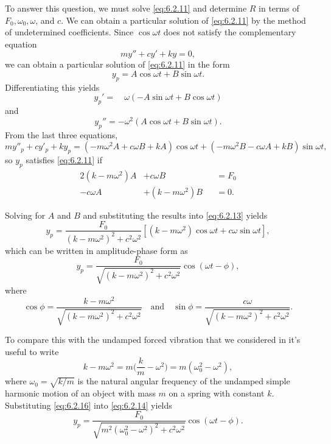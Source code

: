  To
answer this question, we must solve \eqref{eq:6.2.11} and determine $R$ in
terms of $F_0,\omega_0,\omega$, and $c$. We can obtain a particular
solution of \eqref{eq:6.2.11} by the method of undetermined coefficients.
Since $\cos\omega t$ does not satisfy the complementary equation
\[
my''+cy'+ky=0,
\]
we can obtain a particular solution of \eqref{eq:6.2.11} in the form
\begin{equation}\label{eq:6.2.13}
y_p=A\cos\omega t+B\sin\omega t.
\end{equation}
Differentiating this yields
\[
y_p'=\quad\omega (-A\sin\omega t+B\cos\omega t)
\]
and
\[
y_p''=-\omega^2(A\cos\omega t+B\sin\omega t).
\]
 From the last three equations,
\[
my''_p+cy'_p+ky_p=(-m\omega^2A+c\omega B+kA)\cos\omega t+
(-m\omega^2 B-c\omega A+kB)\sin\omega t,
\]
so $y_p$ satisfies  \eqref{eq:6.2.11}  if
\begin{alignat*}{2}
(k-m\omega^2) A&+ c\omega B &&=F_0\\
-c\omega A&+(k-m\omega^2)B &&=0.
\end{alignat*}

Solving  for $A$ and $B$
and substituting the results into  \eqref{eq:6.2.13} yields
\[
y_p=\frac{F_0}{(k-m\omega^2)^2+c^2\omega^2}
\left[(k-m\omega^2)\cos\omega t+c\omega\sin\omega t\right],
\]
which can be written in amplitude-phase form  as
\begin{equation}\label{eq:6.2.14} %
y_p=\frac{F_0}{\sqrt{(k-m\omega^2)^2+c^2\omega^2}}
\cos(\omega t-\phi),
\end{equation}
where
\begin{equation}\label{eq:6.2.15}
\cos\phi=\frac{k-m\omega^2}{\sqrt
{(k-m\omega^2)^2+c^2\omega^2}}\quad\text{and}\quad 
\sin\phi=\frac{c\omega}{\sqrt{(k-m\omega^2)^2+c^2\omega^2}}.
\end{equation}

  To compare this with the undamped forced vibration
that we considered in  it's useful to write
\begin{equation}\label{eq:6.2.16}
k-m\omega^2=m\bigg(\frac{k}{m}-\omega^2\bigg)=
m(\omega_0^2-\omega^2),
\end{equation}
 where $\omega_0=\sqrt{k/m}$ is the natural
angular frequency of the undamped simple harmonic motion of an
object with mass $m$ on a spring with constant $k$.
Substituting  \eqref{eq:6.2.16} into  \eqref{eq:6.2.14} yields
\begin{equation}\label{eq:6.2.17}
y_p=\frac{F_0}{\sqrt{m^2(\omega^2_0-\omega^2)^2+
c^2\omega^2}}\cos(\omega t-\phi).
\end{equation}

